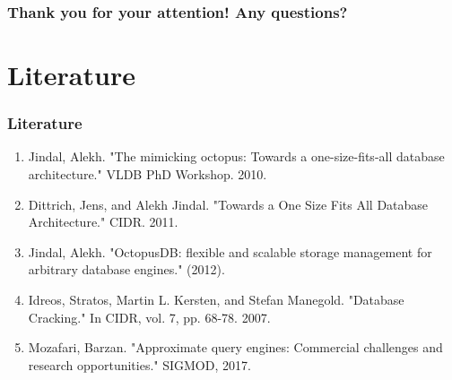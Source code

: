 \documentclass{beamer}
\begin{document}
\begin{frame}
 \frametitle{Thank you for your attention! Any questions?}
\end{frame}

\section{Literature}
\begin{frame}
\frametitle{Literature}
\begin{enumerate}
\item{Jindal, Alekh. "The mimicking octopus: Towards a one-size-fits-all database architecture." VLDB PhD Workshop. 2010.}
\item{Dittrich, Jens, and Alekh Jindal. "Towards a One Size Fits All Database Architecture." CIDR. 2011.}
\item{Jindal, Alekh. "OctopusDB: flexible and scalable storage management for arbitrary database engines." (2012).}
\item{Idreos, Stratos, Martin L. Kersten, and Stefan Manegold. "Database Cracking." In CIDR, vol. 7, pp. 68-78. 2007.}
\item{Mozafari, Barzan. "Approximate query engines: Commercial challenges and research opportunities." SIGMOD, 2017.}
\end{enumerate}
\end{frame}
\end{document}
